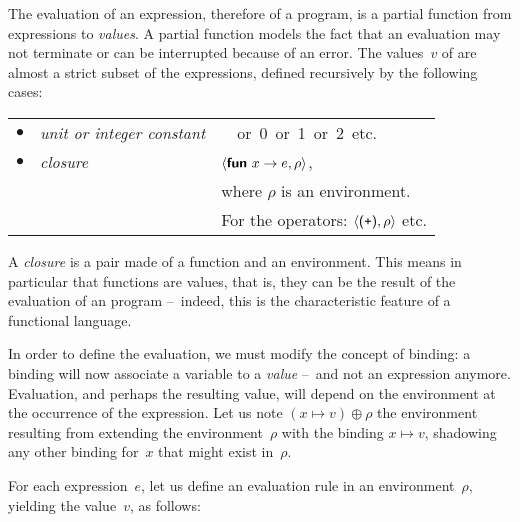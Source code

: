 The evaluation of an expression, therefore of a program, is a partial
function from expressions to \emph{values}. A partial function models
the fact that an evaluation may not terminate or can be interrupted
because of an error. The values~\(v\) of \OCaml are almost a strict
subset of the expressions, defined recursively by the following cases:

\bigskip

\begin{tabular}{rll}
    $\bullet$
  & \emph{unit or integer constant}
  & \unit \ or \textsf{0} or \textsf{1} or \textsf{2} etc.\\
    $\bullet$
  & \emph{closure}
  & $\langle\textsf{\textbf{fun}} \,\, x \rightarrow e, \rho\rangle$,\\
  && where $\rho$ is an environment.\\
  && For the operators: $\langle\textsf{(}{\texttt{+}}\textsf{)}, \rho\rangle$
  etc.
\end{tabular}

\bigskip

A \emph{closure} is a pair made of a function and an environment. This
means in particular that functions are values, that is, they can be
the result of the evaluation of an \OCaml program --~indeed, this is
the characteristic feature of a functional language.

In order to define the evaluation, we must modify the concept of
binding: a binding will now associate a variable to a \emph{value}
--~and not an expression anymore. Evaluation, and perhaps the
resulting value, will depend on the environment at the occurrence of
the expression. Let us note \((x \mapsto v) \oplus \rho\) the
environment resulting from extending the environment~\(\rho\) with the
binding \(x \mapsto v\), shadowing any other binding for~\(x\) that
might exist in~\(\rho\).

For each expression~\(e\), let us define an evaluation rule in an
environment~\(\rho\), yielding the value~\(v\), as follows:

\bigskip

